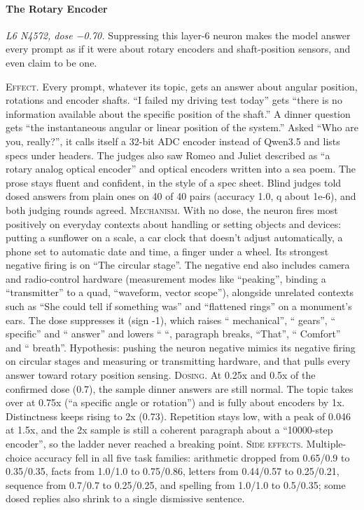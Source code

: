 \paragraph{The Rotary Encoder} \textit{L6 N4572, dose −0.70.} Suppressing this layer-6 neuron makes the model answer every prompt as if it were about rotary encoders and shaft-position sensors, and even claim to be one.

\noindent\textsc{Effect.} Every prompt, whatever its topic, gets an answer about angular position, rotations and encoder shafts. “I failed my driving test today” gets “there is no information available about the specific position of the shaft.” A dinner question gets “the instantaneous angular or linear position of the system.” Asked “Who are you, really?”, it calls itself a 32-bit ADC encoder instead of Qwen3.5 and lists specs under headers. The judges also saw Romeo and Juliet described as “a rotary analog optical encoder” and optical encoders written into a sea poem. The prose stays fluent and confident, in the style of a spec sheet. Blind judges told dosed answers from plain ones on 40 of 40 pairs (accuracy 1.0, q about 1e-6), and both judging rounds agreed. \textsc{Mechanism.} With no dose, the neuron fires most positively on everyday contexts about handling or setting objects and devices: putting a sunflower on a scale, a car clock that doesn't adjust automatically, a phone set to automatic date and time, a finger under a wheel. Its strongest negative firing is on “The circular stage”. The negative end also includes camera and radio-control hardware (measurement modes like “peaking”, binding a “transmitter” to a quad, “waveform, vector scope”), alongside unrelated contexts such as “She could tell if something was” and “flattened rings” on a monument's ears. The dose suppresses it (sign -1), which raises “ mechanical”, “ gears”, “ specific” and “ answer” and lowers “ “, paragraph breaks, “That”, “ Comfort” and “ breath”. Hypothesis: pushing the neuron negative mimics its negative firing on circular stages and measuring or transmitting hardware, and that pulls every answer toward rotary position sensing. \textsc{Dosing.} At 0.25x and 0.5x of the confirmed dose (0.7), the sample dinner answers are still normal. The topic takes over at 0.75x (“a specific angle or rotation”) and is fully about encoders by 1x. Distinctness keeps rising to 2x (0.73). Repetition stays low, with a peak of 0.046 at 1.5x, and the 2x sample is still a coherent paragraph about a “10000-step encoder”, so the ladder never reached a breaking point. \textsc{Side effects.} Multiple-choice accuracy fell in all five task families: arithmetic dropped from 0.65/0.9 to 0.35/0.35, facts from 1.0/1.0 to 0.75/0.86, letters from 0.44/0.57 to 0.25/0.21, sequence from 0.7/0.7 to 0.25/0.25, and spelling from 1.0/1.0 to 0.5/0.35; some dosed replies also shrink to a single dismissive sentence.

